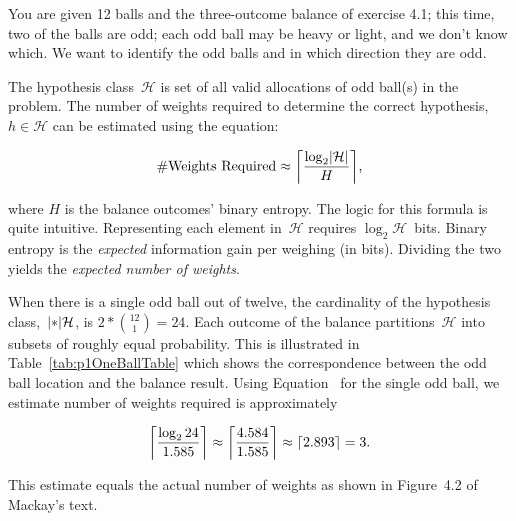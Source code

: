 \begin{problem}{4}{14}
  You are given 12 balls and the three-outcome balance of exercise 4.1; this time, two of the balls are odd; each odd ball may be heavy or light, and we don't know which.  We want to identify the odd balls and in which direction they are odd.
\end{problem}

  The hypothesis class~$\mathcal{H}$ is set of all valid allocations of odd ball(s) in the problem. The number of weights required to determine the correct hypothesis,~$h\in\mathcal{H}$ can be estimated using the equation:
  
  \begin{equation}\label{eq:p1NumbWeightsRequired}
    \#\text{Weights Required} \approx \ceil*{\frac{\log_{2} \abs{\mathcal{H}}}{H}} \text{,}
  \end{equation}
  
  \noindent
  where $H$ is the balance outcomes' binary entropy.  The logic for this formula is quite intuitive. Representing each element in~$\mathcal{H}$ requires ${\log_{2}\mathcal{H}}$~bits.  Binary entropy is the \textit{expected} information gain per weighing (in bits).  Dividing the two yields the \textit{expected number of weights}.
  
  When there is a single odd ball out of twelve, the cardinality of the hypothesis class,~$\abs*{\mathcal{H}}$, is ${2 * \binom{12}{1} = 24}$. Each outcome of the balance partitions~$\mathcal{H}$ into subsets of roughly equal probability. This is illustrated in Table~\ref{tab:p1OneBallTable} which shows the correspondence between the odd ball location and the balance result. Using Equation~ for the single odd ball, we estimate number of weights required is approximately
  
  \[ \ceil*{\frac{\log_{2}24}{1.585}} \approx \ceil*{\frac{4.584}{1.585}} \approx \ceil{2.893} = 3 \text{.} \]
  
  \noindent
  This estimate equals the actual number of weights as shown in Figure~4.2 of Mackay's text.
  

